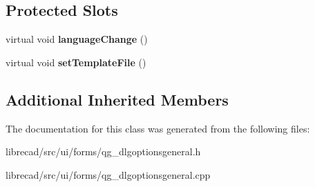 \subsection*{Protected Slots}
\begin{DoxyCompactItemize}
\item 
\hypertarget{classQG__DlgOptionsGeneral_a480e46f30dcc69696f575d304e38a381}{virtual void {\bfseries language\-Change} ()}\label{classQG__DlgOptionsGeneral_a480e46f30dcc69696f575d304e38a381}

\item 
\hypertarget{classQG__DlgOptionsGeneral_a8c76835e13ea8ab5e4bd64a7001220ca}{virtual void {\bfseries set\-Template\-File} ()}\label{classQG__DlgOptionsGeneral_a8c76835e13ea8ab5e4bd64a7001220ca}

\end{DoxyCompactItemize}
\subsection*{Additional Inherited Members}


The documentation for this class was generated from the following files\-:\begin{DoxyCompactItemize}
\item 
librecad/src/ui/forms/qg\-\_\-dlgoptionsgeneral.\-h\item 
librecad/src/ui/forms/qg\-\_\-dlgoptionsgeneral.\-cpp\end{DoxyCompactItemize}
